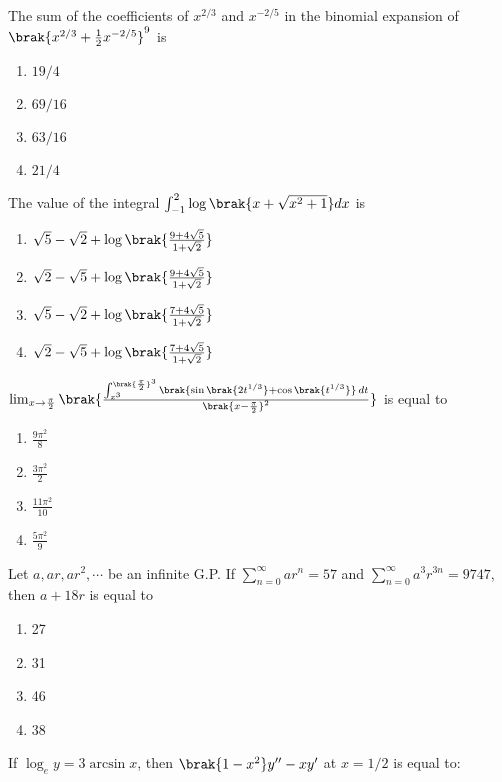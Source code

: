     \item The sum of the coefficients of $x^{2/3}$ and $x^{-2/5}$ in the binomial expansion of $\brak{x^{2/3}+\frac{1}{2}x^{-2/5}}^9$ is
    \begin{enumerate}
        \item $19/4$
        \item $69/16$
        \item $63/16$
        \item $21/4$
    \end{enumerate}
    \item The value of the integral $\int_{-1}^{2} \log{\brak{x + \sqrt{x^{2}+1}}} dx$ is
    \begin{enumerate}
        \item $\sqrt{5}-\sqrt{2}+\log{\brak{\frac{9+4\sqrt{5}}{1+\sqrt{2}}}}$
        \item $\sqrt{2}-\sqrt{5}+\log{\brak{\frac{9+4\sqrt{5}}{1+\sqrt{2}}}}$
        \item $\sqrt{5}-\sqrt{2}+\log{\brak{\frac{7+4\sqrt{5}}{1+\sqrt{2}}}}$
        \item $\sqrt{2}-\sqrt{5}+\log{\brak{\frac{7+4\sqrt{5}}{1+\sqrt{2}}}}$
    \end{enumerate}
    \item $\lim_{x \to \frac{\pi}{2}} \brak{ \frac{\int_{x^3}^{\brak{ \frac{\pi}{2} }^3} \brak{ \sin \brak{ 2t^{1/3} } + \cos \brak{ t^{1/3} } } \, dt }{\brak{x - \frac{\pi}{2}}^2} }$ is equal to
    \begin{enumerate}
        \item $\frac{9\pi^2}{8}$
        \item $\frac{3\pi^2}{2}$
        \item $\frac{11\pi^2}{10}$
        \item $\frac{5\pi^2}{9}$
    \end{enumerate}
    \item Let $a,ar,ar^2,\cdots$ be an infinite G.P. If $\sum_{n=0}^{\infty}ar^n=57$ and $\sum_{n=0}^{\infty}a^3r^{3n}=9747$, then $a+18r$ is equal to 
    \begin{enumerate}
    	\item 27
    	\item 31
    	\item 46
    	\item 38
    \end{enumerate}
    \item If $\log_e y = 3\arcsin{x}$, then $\brak{1-x^2}y^{\prime\prime}-xy^{\prime}$ at $x = 1/2$ is equal to:
